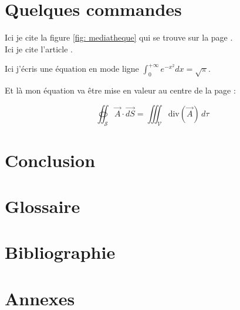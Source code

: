 \documentclass{rapportECM}
\begin{document}
\section{Quelques commandes}




Ici je cite la figure \ref{fig: mediatheque} qui se trouve sur la page \pageref{fig: mediatheque}.\\

Ici je cite l'article \cite{Debauche2021}.

Ici j'écris une équation en mode ligne $\int_0^{+\infty} e^{-x^2} dx = \sqrt{\pi}$.

Et là mon équation va être mise en valeur au centre de la page :

$$
\oiint_{\mathcal{S}} \vec{A} \cdot \vec{dS} = \iiint_{\mathcal{V}} \textrm{div}(\vec{A}) \, d\tau
$$

\section*{Conclusion}
\lipsum[1-2]

\newpage
\pagestyle{glossaire}
\section*{Glossaire}

\pagebreak

\newpage
\pagestyle{biblio}
\section*{Bibliographie}
\printbibliography[ heading = none]
\pagebreak

\section*{Annexes}
\pagestyle{annexes}
\initannexes

\end{document}
